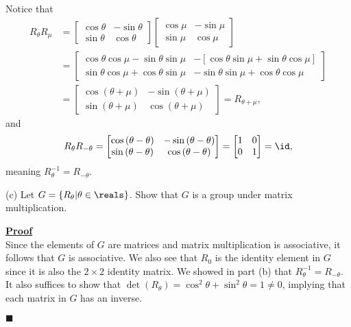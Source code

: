 \documentclass[12pt,a4paper]{article}
\newenvironment{proof}
{
\textbf{\underline{Proof}} \\
}
{
\begin{flushright}
$\blacksquare$
\end{flushright}}
\begin{document}
Notice that 
\begin{align*}
R_{\theta}R_{\mu} &= \begin{bmatrix}
\cos{\theta} & -\sin{\theta} \\
\sin{\theta} & \cos{\theta}
\end{bmatrix}
\begin{bmatrix}
\cos{\mu} & -\sin{\mu} \\
\sin{\mu} & \cos{\mu}
\end{bmatrix} 
\\
&= 
\begin{bmatrix}
\cos{\theta}\cos{\mu} - \sin{\theta}\sin{\mu} & 
-[\cos{\theta}\sin{\mu} + \sin{\theta}\cos{\mu}] \\
\sin{\theta}\cos{\mu} + \cos{\theta}\sin{\mu} &
-\sin{\theta}\sin{\mu} + \cos{\theta}\cos{\mu}
\end{bmatrix}
\\
&= \begin{bmatrix}
\cos{(\theta + \mu)} & -\sin{(\theta + \mu)} \\
\sin{(\theta + \mu)} & \cos{(\theta + \mu)}
\end{bmatrix}
= R_{\theta + \mu},
\end{align*}
and
\begin{align*}
R_{\theta}R_{-\theta} = \begin{bmatrix}
\cos{(\theta - \theta)} & -\sin{(\theta - \theta)} \\
\sin{(\theta - \theta)} & \cos{(\theta - \theta)}
\end{bmatrix}
=
\begin{bmatrix}
1 & 0 \\
0 & 1
\end{bmatrix}
= \id,
\end{align*}
meaning $R_{\theta}^{-1} = R_{-\theta}$.

(c) Let $G = \{R_{\theta}|\theta\in\reals\}$. Show that $G$ is a group under matrix multiplication.

\begin{proof}
Since the elements of $G$ are matrices and matrix multiplication is associative, it follows that $G$ is associative. We also see that $R_{0}$ is the identity element in $G$ since it is also the $2 \times 2$ identity matrix. We showed in part (b) that $R_{\theta}^{-1} = R_{-\theta}$. It also suffices to show that $\det(R_{\theta}) = \cos^2{\theta} + \sin^2{\theta} = 1 \not= 0$, implying that each matrix in $G$ has an inverse. 
\end{proof}
\end{document}
